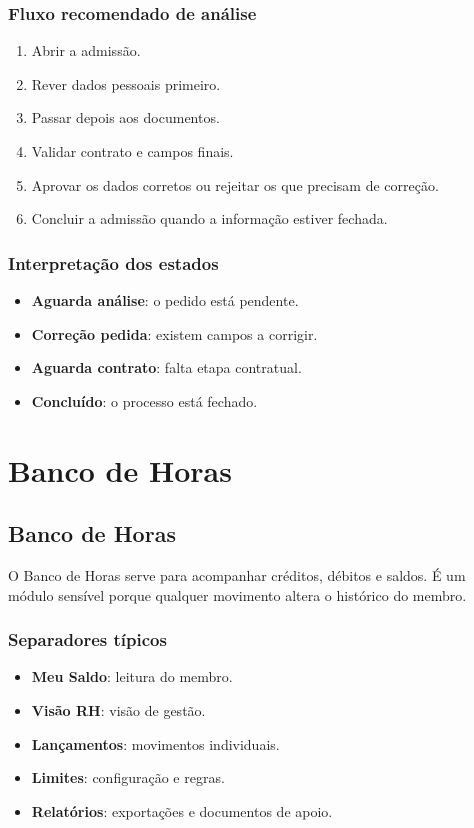 \subsection{Fluxo recomendado de análise}
\begin{enumerate}
  \item Abrir a admissão.
  \item Rever dados pessoais primeiro.
  \item Passar depois aos documentos.
  \item Validar contrato e campos finais.
  \item Aprovar os dados corretos ou rejeitar os que precisam de correção.
  \item Concluir a admissão quando a informação estiver fechada.
\end{enumerate}

\subsection{Interpretação dos estados}
\begin{itemize}
  \item \textbf{Aguarda análise}: o pedido está pendente.
  \item \textbf{Correção pedida}: existem campos a corrigir.
  \item \textbf{Aguarda contrato}: falta etapa contratual.
  \item \textbf{Concluído}: o processo está fechado.
\end{itemize}

\chapter{Banco de Horas}
\section{Banco de Horas}
O Banco de Horas serve para acompanhar créditos, débitos e saldos. É um módulo sensível porque qualquer movimento altera o histórico do membro.

\subsection{Separadores típicos}
\begin{itemize}
  \item \textbf{Meu Saldo}: leitura do membro.
  \item \textbf{Visão RH}: visão de gestão.
  \item \textbf{Lançamentos}: movimentos individuais.
  \item \textbf{Limites}: configuração e regras.
  \item \textbf{Relatórios}: exportações e documentos de apoio.
\end{itemize}

